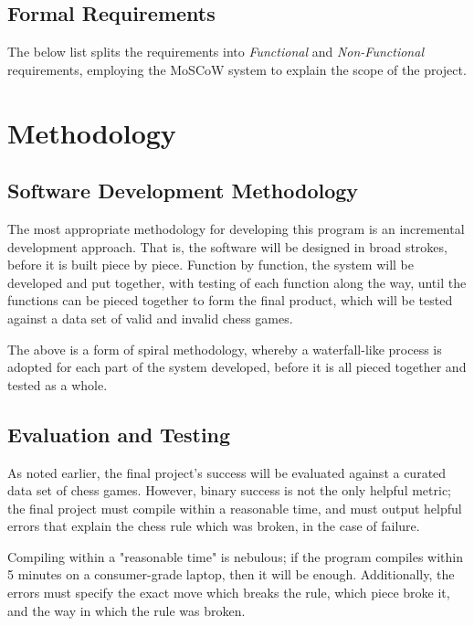 \documentclass[12pt, a4paper]{scrartcl}
\begin{document}

\subsection{Formal Requirements}

The below list splits the requirements into \emph{Functional} and \emph{Non-Functional} requirements, employing the MoSCoW system to explain the scope of the project.


\section{Methodology}

\subsection{Software Development Methodology}

The most appropriate methodology for developing this program is an incremental development approach. That is, the software will be designed in broad strokes, before it is built piece by piece. Function by function, the system will be developed and put together, with testing of each function along the way, until the functions can be pieced together to form the final product, which will be tested against a data set of valid and invalid chess games.

The above is a form of spiral methodology, whereby a waterfall-like process is adopted for each part of the system developed, before it is all pieced together and tested as a whole.

\subsection{Evaluation and Testing}

As noted earlier, the final project's success will be evaluated against a curated data set of chess games. However, binary success is not the only helpful metric; the final project must compile within a reasonable time, and must output helpful errors that explain the chess rule which was broken, in the case of failure.

Compiling within a "reasonable time" is nebulous; if the program compiles within 5 minutes on a consumer-grade laptop, then it will be enough. Additionally, the errors must specify the exact move which breaks the rule, which piece broke it, and the way in which the rule was broken.
\end{document}
